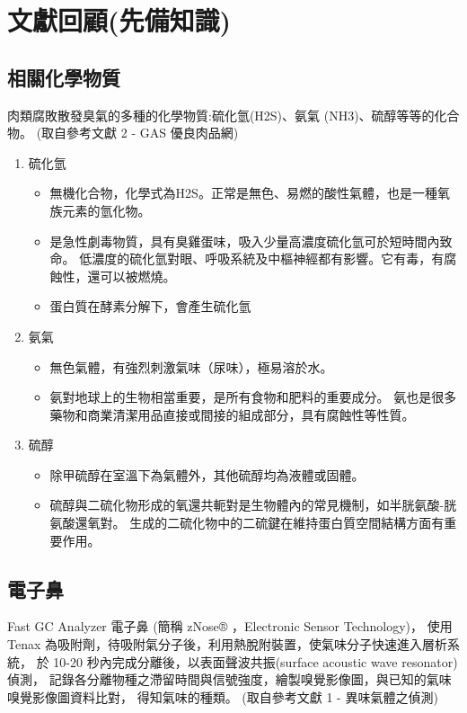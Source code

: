 \chapter{文獻回顧(先備知識)}

\section{相關化學物質}
肉類腐敗散發臭氣的多種的化學物質:硫化氫(H2S)、氨氣 (NH3)、硫醇等等的化合物。
(取自參考文獻 2 - GAS 優良肉品網) 
\begin{enumerate}
	\item 硫化氫 \begin{itemize}
		\item 無機化合物，化學式為H2S。正常是無色、易燃的酸性氣體，也是一種氧族元素的氫化物。
		\item 是急性劇毒物質，具有臭雞蛋味，吸入少量高濃度硫化氫可於短時間內致命。
			低濃度的硫化氫對眼、呼吸系統及中樞神經都有影響。它有毒，有腐蝕性，還可以被燃燒。
		\item 蛋白質在酵素分解下，會產生硫化氫
	\end{itemize}
	\item 氨氣 \begin{itemize}
		\item 無色氣體，有強烈刺激氣味（尿味），極易溶於水。
		\item 氨對地球上的生物相當重要，是所有食物和肥料的重要成分。
			氨也是很多藥物和商業清潔用品直接或間接的組成部分，具有腐蝕性等性質。
	\end{itemize}
	\item 硫醇 \begin{itemize}
		\item 除甲硫醇在室溫下為氣體外，其他硫醇均為液體或固體。
		\item 硫醇與二硫化物形成的氧還共軛對是生物體內的常見機制，如半胱氨酸-胱氨酸還氧對。
			生成的二硫化物中的二硫鍵在維持蛋白質空間結構方面有重要作用。
	\end{itemize}
\end{enumerate}

\section{電子鼻}
Fast GC Analyzer 電子鼻 (簡稱 zNose® ，Electronic Sensor Technology)，
使用 Tenax 為吸附劑，待吸附氣分子後，利用熱脫附裝置，使氣味分子快速進入層析系統，
於 10-20 秒內完成分離後，以表面聲波共振(surface acoustic wave resonator) 偵測，
記錄各分離物種之滯留時間與信號強度，繪製嗅覺影像圖，與已知的氣味嗅覺影像圖資料比對，
得知氣味的種類。 (取自參考文獻 1 - 異味氣體之偵測) 

